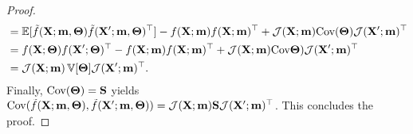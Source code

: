 \begin{appendices}
\begin{proof}
\begin{align}
    &= \mathbb{E}[ \smash{\tilde{f}}(\mathbf X ; \mathbf{m}, \boldsymbol{\Theta}) \smash{\tilde{f}}(\mathbf X'; \mathbf{m}, \boldsymbol{\Theta})^\top ] - f(\mathbf X ; \mathbf{m}) f(\mathbf X ; \mathbf{m})^\top + \mathcal{J}(\mathbf X ; \mathbf{m}) \text{Cov}( \boldsymbol{\Theta} ) \mathcal{J}(\mathbf X' ; \mathbf{m})^\top
    \\
    &= f(\mathbf X ; \boldsymbol{\Theta}) f(\mathbf X'; \boldsymbol{\Theta})^\top - f(\mathbf X ; \mathbf{m}) f(\mathbf X ; \mathbf{m})^\top + \mathcal{J}(\mathbf X ; \mathbf{m}) \text{Cov} \boldsymbol{\Theta} ) \mathcal{J}(\mathbf X' ; \mathbf{m})^\top
    \\
    &= \mathcal{J}(\mathbf X ; \mathbf{m}) \operatorname{\mathbb{V}}[ \boldsymbol{\Theta} ] \mathcal{J}(\mathbf X' ; \mathbf{m})^\top.
\end{align}
Finally, $\text{Cov} (\boldsymbol{\Theta} ) = \mathbf{S}$ yields $\textrm{Cov}(\smash{\tilde{f}}(\mathbf X ; \mathbf{m}, \boldsymbol{\Theta}), \smash{\tilde{f}}(\mathbf X'; \mathbf{m}, \boldsymbol{\Theta})) = \mathcal{J}(\mathbf X ; \mathbf{m}) \mathbf{S} \mathcal{J}(\mathbf X' ; \mathbf{m})^\top$.
This concludes the proof.
\end{proof}

\clearpage



\end{appendices}
